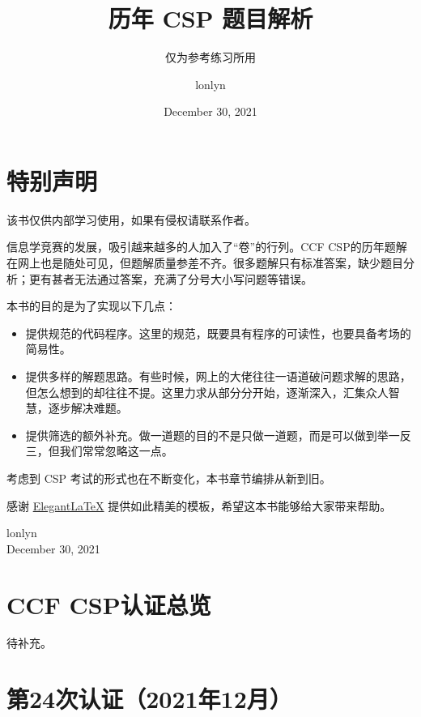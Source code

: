 \documentclass[cn,10pt,math=newtx,citestyle=gb7714-2015,bibstyle=gb7714-2015]{elegantbook}
\title{历年 CSP 题目解析}
\subtitle{仅为参考练习所用}
\author{lonlyn}
\institute{Shanxi University Algorithm Group}
\date{December 30, 2021}
\begin{document}
\maketitle
\frontmatter

\chapter*{特别声明}


该书仅供内部学习使用，如果有侵权请联系作者。

信息学竞赛的发展，吸引越来越多的人加入了“卷”的行列。CCF CSP的历年题解在网上也是随处可见，但题解质量参差不齐。很多题解只有标准答案，缺少题目分析；更有甚者无法通过答案，充满了分号大小写问题等错误。

本书的目的是为了实现以下几点：

\begin{itemize}
  \item 提供规范的代码程序。这里的规范，既要具有程序的可读性，也要具备考场的简易性。
  \item 提供多样的解题思路。有些时候，网上的大佬往往一语道破问题求解的思路，但怎么想到的却往往不提。这里力求从部分分开始，逐渐深入，汇集众人智慧，逐步解决难题。
  \item 提供筛选的额外补充。做一道题的目的不是只做一道题，而是可以做到举一反三，但我们常常忽略这一点。
\end{itemize}

考虑到 CSP 考试的形式也在不断变化，本书章节编排从新到旧。

感谢 \href{https://github.com/ElegantLaTeX/ElegantBook}{Elegant\LaTeX{}} 提供如此精美的模板，希望这本书能够给大家带来帮助。

\vskip 1.5cm

\begin{flushright}
  lonlyn\\
  December 30, 2021
\end{flushright}

\tableofcontents

\mainmatter

\chapter{CCF CSP认证总览}

待补充。


\chapter{第24次认证（2021年12月）}
\end{document}

